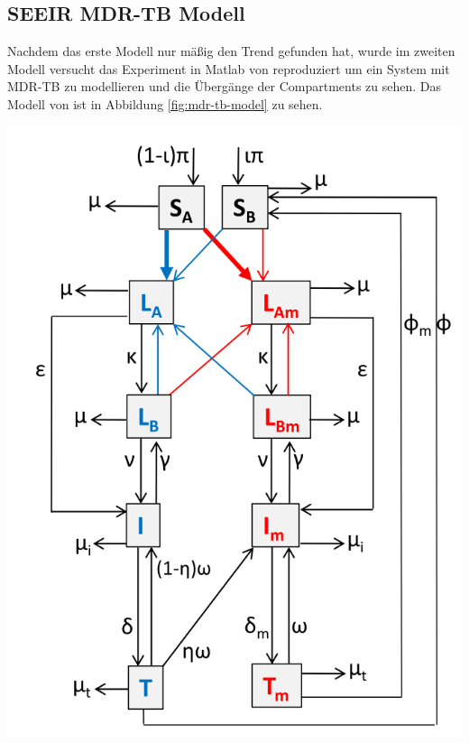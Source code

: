\documentclass[paper=a4, fontsize=11pt, ngerman, abstract=on]{scrartcl}
\numberwithin{equation}{section} %
\numberwithin{figure}{section} %
\numberwithin{table}{section} %
\begin{document}
\subsection{SEEIR MDR-TB Modell}

Nachdem das erste Modell nur mäßig den Trend gefunden hat, wurde im zweiten Modell versucht das Experiment in Matlab von \cite{Trauer2014} reproduziert um ein System mit MDR-TB zu modellieren und die Übergänge der Compartments zu sehen. Das Modell von \cite{Trauer2014} ist in Abbildung \ref{fig:mdr-tb-model} zu sehen.

\begin{minipage}{0.4\linewidth}
  \includegraphics[width=\linewidth]{images/mdr_tb_model}
  \label{fig:mdr-tb-model}
\end{minipage}\hfill
\end{document}
